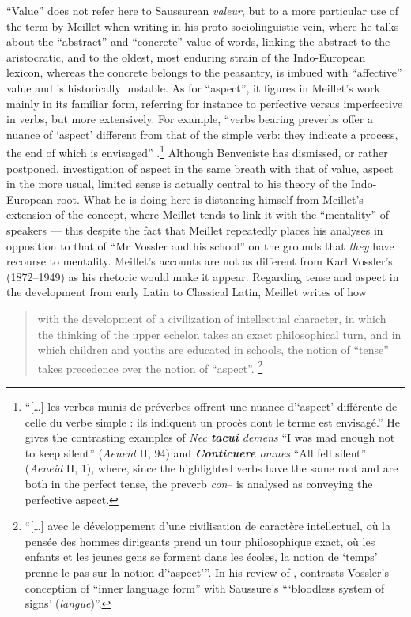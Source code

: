 \documentclass[output=paper]{langscibook}
\begin{document}
``Value'' does not refer here to Saussurean \emph{valeur}, but to a more particular use of the term by Meillet when writing in his proto-sociolinguistic vein, where he talks about the ``abstract'' and ``concrete'' value of words, linking the abstract to the aristocratic, and to the oldest, most enduring strain of the Indo-European lexicon, whereas the concrete belongs to the peasantry, is imbued with ``affective'' value and is historically unstable. As for ``aspect'', it figures in Meillet's work mainly in its familiar form, referring for instance to perfective versus imperfective in verbs, but more extensively. For example, ``verbs bearing preverbs offer a nuance of `aspect' different from that of the simple verb: they indicate a process, the end of which is envisaged'' \citep[263--264]{Meillet1931}.\footnote{``[…] les verbes munis de préverbes offrent une nuance d’`aspect' différente de celle du verbe simple : ils indiquent un procès dont le terme est envisagé.'' He gives the contrasting examples of \emph{Nec \textbf{tacui} demens} ``I was mad enough not to keep silent'' (\emph{Aeneid} II, 94) and \emph{\textbf{Conticuere} omnes} ``All fell silent'' (\emph{Aeneid} II, 1), where, since the highlighted verbs have the same root and are both in the perfect tense, the preverb \emph{con}-- is analysed as conveying the perfective aspect.} Although Benveniste has dismissed, or rather postponed, investigation of aspect in the same breath with that of value, aspect in the more usual, limited sense is actually central to his theory of the Indo-European root. What he is doing here is distancing himself from Meillet's extension of the concept, where Meillet tends to link it with the ``mentality'' of speakers — this despite the fact that Meillet repeatedly places his analyses in opposition to that of ``Mr Vossler and his school'' on the grounds that \emph{they} have recourse to mentality. Meillet's accounts are not as different from Karl Vossler's (1872--1949) as his rhetoric would make it appear. Regarding tense and aspect in the development from early Latin to Classical Latin, Meillet writes of how

\begin{quotation}
with the development of a civilization of intellectual character, in which the thinking of the upper echelon takes an exact philosophical turn, and in which children and youths are educated in schools, the notion of ``tense'' takes precedence over the notion of ``aspect''. \citep[270--271]{Meillet1931}\footnote{``[…] avec le développement d'une civilisation de caractère intellectuel, où la pensée des hommes dirigeants prend un tour philosophique exact, où les enfants et les jeunes gens se forment dans les écoles, la notion de `temps' prenne le pas sur la notion d'`aspect'\thinspace''. In his review of \citet{Vossler1932}, \citet[234]{Firth1933} contrasts Vossler's conception of ``inner language form'' with Saussure's ```bloodless system of signs' (\emph{langue})''.}
\end{quotation}
\end{document}
